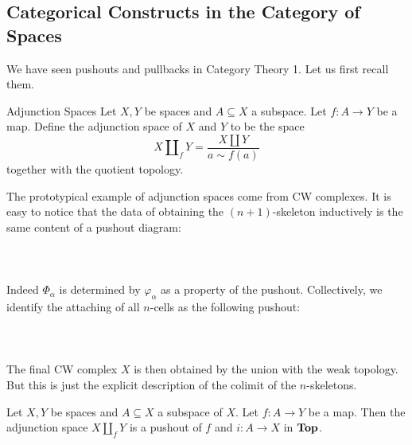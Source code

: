 \documentclass[a4paper]{article}
\begin{document}
\subsection{Categorical Constructs in the Category of Spaces}
We have seen pushouts and pullbacks in Category Theory 1. Let us first recall them. 

\begin{defn}{Adjunction Spaces}{} Let $X,Y$ be spaces and $A\subseteq X$ a subspace. Let $f:A\to Y$ be a map. Define the adjunction space of $X$ and $Y$ to be  the space $$X\amalg_fY=\frac{X\amalg Y}{a\sim f(a)}$$ together with the quotient topology. 
\end{defn}

The prototypical example of adjunction spaces come from CW complexes. It is easy to notice that the data of obtaining the $(n+1)$-skeleton inductively is the same content of a pushout diagram: \\~\\
\\~\\
Indeed $\Phi_\alpha$ is determined by $\varphi_\alpha$ as a property of the pushout. Collectively, we identify the attaching of all $n$-cells as the following pushout: \\~\\
\\~\\

The final CW complex $X$ is then obtained by the union with the weak topology. But this is just the explicit description of the colimit of the $n$-skeletons. 

\begin{prp}{}{} Let $X,Y$ be spaces and $A\subseteq X$ a subspace of $X$. Let $f:A\to Y$ be a map. Then the adjunction space $X\amalg_f Y$ is a pushout of $f$ and $i:A\to X$ in $\bold{Top}$. 
\end{prp}
\end{document}
